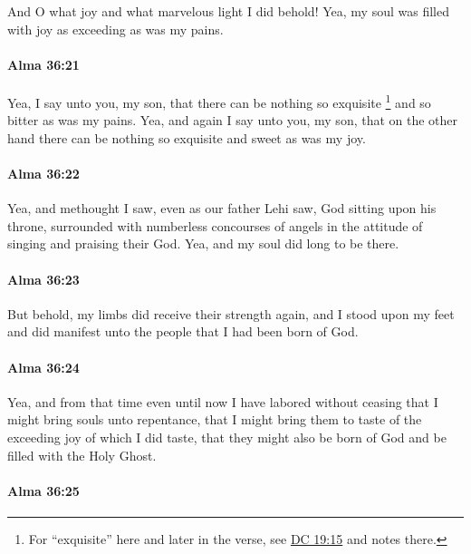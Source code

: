 			And O what joy and what marvelous light I did behold!
			Yea, my soul was filled with joy as exceeding as was my pains.

		\paragraph{Alma 36:21} %
			\label{ALMA-36-21}

			Yea, I say unto you, my son,
			that there can be nothing so exquisite%
				\footnote{%
					For ``exquisite'' here and later in the verse, see \hyperref[DC19-15]{DC 19:15} and notes there.
					}
			and so bitter as was my pains.
			Yea, and again I say unto you, my son,
			that on the other hand
			there can be nothing so exquisite and sweet as was my joy.

		\paragraph{Alma 36:22} %
			\label{ALMA-36-22}

			Yea, and methought I saw, even as our father Lehi saw,
			God sitting upon his throne,
			surrounded with numberless concourses of angels
			in the attitude of singing and praising their God.
			Yea, and my soul did long to be there.

		\paragraph{Alma 36:23} %
			\label{ALMA-36-23}

			But behold, my limbs did receive their strength again,
			and I stood upon my feet and did manifest unto the people
			that I had been born of God.

		\paragraph{Alma 36:24} %
			\label{ALMA-36-24}

			Yea, and from that time even until now I have labored without ceasing
			that I might bring souls unto repentance,
			that I might bring them to taste of the exceeding joy of which I did taste,
			that they might also be born of God and be filled with the Holy Ghost.

		\paragraph{Alma 36:25} %
			\label{ALMA-36-25}

